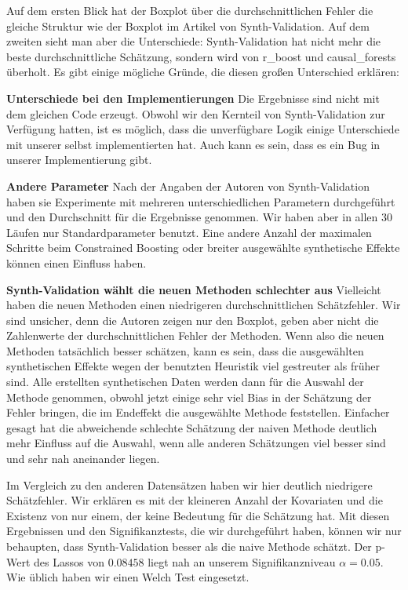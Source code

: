 \documentclass[12pt,a4paper,twoside]{scrartcl}
\numberwithin{equation}{section}
\begin{document}
\noindent
Auf dem ersten Blick hat der Boxplot über die durchschnittlichen Fehler die gleiche Struktur wie der Boxplot im Artikel von Synth-Validation\cite{schuler2017synth}. Auf dem zweiten sieht man aber die Unterschiede: Synth-Validation hat nicht mehr die beste durchschnittliche Schätzung, sondern wird von r\_boost und causal\_forests überholt. Es gibt einige mögliche Gründe, die diesen großen  Unterschied erklären: \par

\noindent
\textbf{Unterschiede bei den Implementierungen} Die Ergebnisse sind nicht mit dem gleichen Code erzeugt. Obwohl wir den Kernteil von Synth-Validation zur Verfügung hatten, ist es möglich, dass die unverfügbare Logik einige Unterschiede mit unserer selbst implementierten hat. Auch kann es sein, dass es ein Bug in unserer Implementierung gibt.
\par

\noindent
\textbf{Andere Parameter} Nach der Angaben der Autoren von Synth-Validation haben sie Experimente mit mehreren unterschiedlichen Parametern durchgeführt und den Durchschnitt für die Ergebnisse genommen\cite{schuler2017synth}. Wir haben aber in allen 30 Läufen nur Standardparameter benutzt. Eine andere Anzahl der maximalen Schritte beim Constrained Boosting oder breiter ausgewählte synthetische Effekte können einen Einfluss haben.  
\par

\noindent
\textbf{Synth-Validation wählt die neuen Methoden schlechter aus} Vielleicht haben die neuen Methoden einen niedrigeren durchschnittlichen Schätzfehler. Wir sind unsicher, denn die Autoren zeigen nur den Boxplot, geben aber nicht die Zahlenwerte der durchschnittlichen Fehler der Methoden. Wenn also die neuen Methoden tatsächlich besser schätzen, kann es sein, dass die ausgewählten synthetischen Effekte wegen der benutzten Heuristik viel gestreuter als früher sind. Alle erstellten synthetischen Daten werden dann für die Auswahl der Methode genommen, obwohl jetzt einige sehr viel Bias in der Schätzung der Fehler bringen, die im Endeffekt die ausgewählte Methode feststellen. Einfacher gesagt hat die abweichende schlechte Schätzung der naiven Methode deutlich mehr Einfluss auf die Auswahl, wenn alle anderen Schätzungen viel besser sind und sehr nah aneinander liegen. 
\par

\noindent
Im Vergleich zu den anderen Datensätzen haben wir hier deutlich niedrigere Schätzfehler. Wir erklären es mit der kleineren Anzahl der Kovariaten und die Existenz von nur einem, der keine Bedeutung für die Schätzung hat. Mit diesen Ergebnissen und den Signifikanztests, die wir durchgeführt haben, können wir nur behaupten, dass Synth-Validation besser als die naive Methode schätzt. Der p-Wert des Lassos von $0.08458$ liegt nah an unserem Signifikanzniveau $\alpha=0.05$. Wie üblich haben wir einen Welch Test eingesetzt.\par
\end{document}
